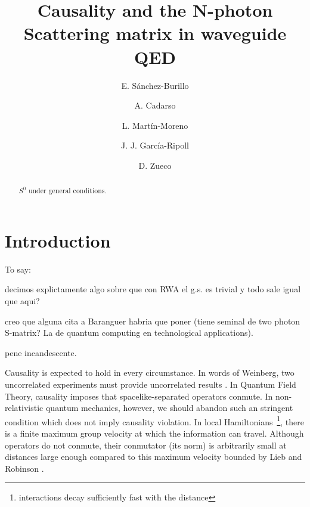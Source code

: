 \documentclass[notitlepage, prx, preprint, amsmath,superscriptaddress,amssymb]{revtex4-1}
\begin{document}
\title{Causality and the N-photon Scattering matrix in waveguide QED}

\author{E. S\'anchez-Burillo}

\author{A. Cadarso}

\author{L. Mart\'in-Moreno}

\author{J. J. Garc\'ia-Ripoll}

\author{D. Zueco}



\begin{abstract}
$S^0$ under general conditions.
\end{abstract}



\maketitle

\section{Introduction}


{\color{red}
To say:

decimos explictamente algo sobre que con RWA el g.s. es trivial y todo sale igual que aqui?


creo que alguna cita a Baranguer habria que poner (tiene seminal de two photon S-matrix? La de quantum computing en technological applications).

pene incandescente.

}

Causality is  expected to hold in every circumstance.    In words of Weinberg, two uncorrelated experiments must provide uncorrelated results \cite{Weinberg1996}.     In Quantum Field Theory, causality imposes that  spacelike-separated operators conmute.   In non-relativistic quantum mechanics, however, we should abandon such an stringent condition which  does not imply causality violation.  In local Hamiltonians~\footnote{interactions decay sufficiently fast with the distance}, there is a finite maximum  group velocity at which the information can travel.   Although operators do not conmute,  their conmutator  (its norm) is arbitrarily small at distances large enough compared to this maximum velocity  bounded by Lieb and Robinson \cite{Lieb1972}.  
\end{document}
